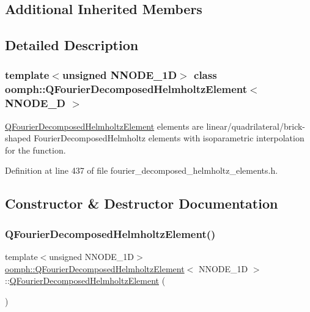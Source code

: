 \subsection*{Additional Inherited Members}


\subsection{Detailed Description}
\subsubsection*{template$<$unsigned N\+N\+O\+D\+E\+\_\+1D$>$\newline
class oomph\+::\+Q\+Fourier\+Decomposed\+Helmholtz\+Element$<$ N\+N\+O\+D\+E\+\_\+D $>$}

\hyperlink{classoomph_1_1QFourierDecomposedHelmholtzElement}{Q\+Fourier\+Decomposed\+Helmholtz\+Element} elements are linear/quadrilateral/brick-\/shaped Fourier\+Decomposed\+Helmholtz elements with isoparametric interpolation for the function. 

Definition at line 437 of file fourier\+\_\+decomposed\+\_\+helmholtz\+\_\+elements.\+h.



\subsection{Constructor \& Destructor Documentation}
\mbox{\label{classoomph_1_1QFourierDecomposedHelmholtzElement_a715abcf373a32565a87d70a09d5ed314}} 
\subsubsection{\texorpdfstring{Q\+Fourier\+Decomposed\+Helmholtz\+Element()}{QFourierDecomposedHelmholtzElement()}\hspace{0.1cm}{\footnotesize\ttfamily [1/2]}}
{\footnotesize\ttfamily template$<$unsigned N\+N\+O\+D\+E\+\_\+1D$>$ \\
\hyperlink{classoomph_1_1QFourierDecomposedHelmholtzElement}{oomph\+::\+Q\+Fourier\+Decomposed\+Helmholtz\+Element}$<$ N\+N\+O\+D\+E\+\_\+1D $>$\+::\hyperlink{classoomph_1_1QFourierDecomposedHelmholtzElement}{Q\+Fourier\+Decomposed\+Helmholtz\+Element} (\begin{DoxyParamCaption}{ }\end{DoxyParamCaption})\hspace{0.3cm}{\ttfamily [inline]}}



